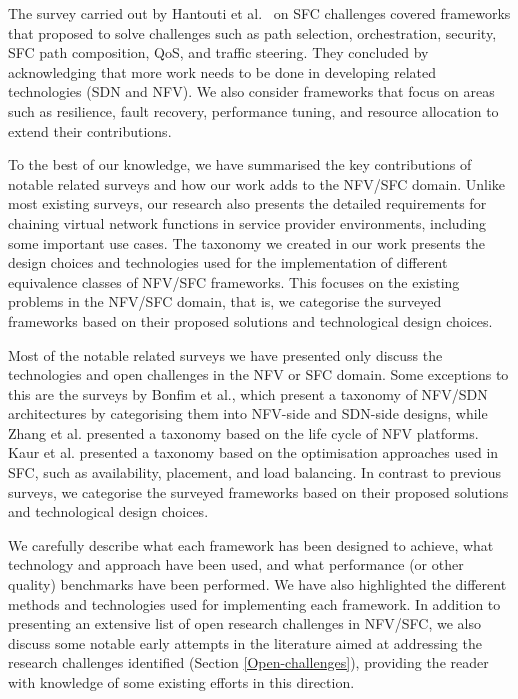 \documentclass[futureinternet,review,accept,pdftex,moreauthors]{Definitions/mdpi}
\begin{document}
 
The survey carried out by Hantouti {et al.}~\cite{hantouti2020service} on SFC challenges covered frameworks that proposed to solve challenges such as path selection, orchestration, security, SFC path composition, QoS, and traffic steering. They concluded by acknowledging that more work needs to be done in developing related technologies (SDN and NFV). We also consider frameworks that focus on areas such as resilience, fault recovery, performance tuning, and resource allocation to extend their contributions.

To the best of our knowledge, we have summarised the key contributions of notable related surveys and how our work adds to the NFV/SFC domain. Unlike most existing surveys, our research also presents the detailed requirements for chaining virtual network functions in service provider environments, including some important use cases. The taxonomy we created in our work presents the design choices and technologies used for the implementation of different equivalence classes of NFV/SFC frameworks. This focuses on the existing problems in the NFV/SFC domain, that is, we categorise the surveyed frameworks based on their proposed solutions and technological design choices.
 
 Most of the notable related surveys we have presented only discuss the technologies and open challenges in the NFV or SFC domain. Some exceptions to this are the surveys by Bonfim et al., which present a taxonomy of NFV/SDN architectures by categorising them into NFV-side and SDN-side designs, while Zhang et al. presented a taxonomy based on the life cycle of NFV platforms. Kaur et al. presented a taxonomy based on the optimisation approaches used in SFC, such as availability, placement, and load balancing. In contrast to previous surveys, we categorise the surveyed frameworks based on their proposed solutions and technological design choices. 
 
 We carefully describe what each framework has been designed to achieve, what technology and approach have been used, and what performance (or other quality) benchmarks have been performed. We have also highlighted the different methods and technologies used for  implementing each framework. In addition to presenting an extensive list of open research challenges in NFV/SFC, we also discuss some notable early  attempts in the literature aimed at addressing the research challenges identified (Section \ref{Open-challenges}), providing  the reader with knowledge of some existing efforts in this direction. 
\end{document}
